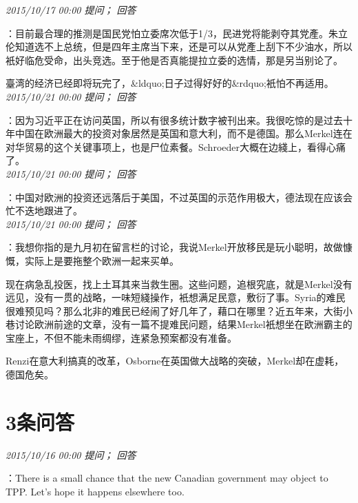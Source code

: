 \documentclass[twocolumn]{ctexart}
\begin{document}
\textit{\hfill\noindent\small 2015/10/17 00:00 提问； 回答}

：目前最合理的推测是国民党怕立委席次低于1/3，民进党将能剥夺其党產。朱立伦知道选不上总统，但是四年主席当下来，还是可以从党產上刮下不少油水，所以衹好临危受命，出头竞选。至于他是否真能提拉立委的选情，那是另当别论了。

臺湾的经济已经即将玩完了，\&ldquo;日子过得好好的\&rdquo;衹怕不再适用。\\

\textit{\hfill\noindent\small 2015/10/21 00:00 提问； 回答}

：因为习近平正在访问英国，所以有很多统计数字被刊出来。我很吃惊的是过去十年中国在欧洲最大的投资对象居然是英国和意大利，而不是德国。那么Merkel连在对华贸易的这个关键事项上，也是尸位素餐。Schroeder大概在边綫上，看得心痛了。\\

\textit{\hfill\noindent\small 2015/10/21 00:00 提问； 回答}

：中国对欧洲的投资还远落后于美国，不过英国的示范作用极大，德法现在应该会忙不迭地跟进了。\\

\textit{\hfill\noindent\small 2015/10/21 00:00 提问； 回答}

：我想你指的是九月初在留言栏的讨论，我说Merkel开放移民是玩小聪明，故做慷慨，实际上是要拖整个欧洲一起来买单。

现在病急乱投医，找上土耳其来当救生圈。这些问题，追根究底，就是Merkel没有远见，没有一贯的战略，一味短綫操作，衹想满足民意，敷衍了事。Syria的难民很难预见吗？那么北非的难民已经闹了好几年了，藉口在哪里？近五年来，大街小巷讨论欧洲前途的文章，没有一篇不提难民问题，结果Merkel衹想坐在欧洲霸主的宝座上，不但不能未雨绸缪，连紧急预案都没有准备。

Renzi在意大利搞真的改革，Osborne在英国做大战略的突破，Merkel却在虚耗，德国危矣。\\

\section{3条问答}

\textit{\hfill\noindent\small 2015/10/16 00:00 提问； 回答}

：There is a small chance that the new Canadian government may object to TPP. Let's hope it happens elsewhere too.\\
\end{document}
